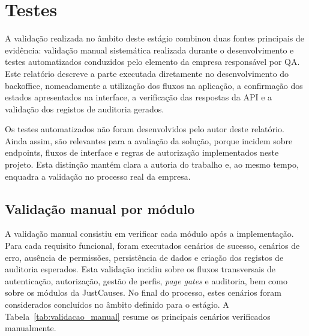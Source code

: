 
\section{Testes}
\label{sec:testes}

A validação realizada no âmbito deste estágio combinou duas fontes principais de evidência: validação manual sistemática realizada durante o desenvolvimento e testes automatizados conduzidos pelo elemento da empresa responsável por \gls{QA}. Este relatório descreve a parte executada diretamente no desenvolvimento do backoffice, nomeadamente a utilização dos fluxos na aplicação, a confirmação dos estados apresentados na interface, a verificação das respostas da \gls{API} e a validação dos registos de auditoria gerados.

Os testes automatizados não foram desenvolvidos pelo autor deste relatório. Ainda assim, são relevantes para a avaliação da solução, porque incidem sobre endpoints, fluxos de interface e regras de autorização implementados neste projeto. Esta distinção mantém clara a autoria do trabalho e, ao mesmo tempo, enquadra a validação no processo real da empresa.

\subsection{Validação manual por módulo}
\label{subsec:testes_manual}

A validação manual consistiu em verificar cada módulo após a implementação. Para cada requisito funcional, foram executados cenários de sucesso, cenários de erro, ausência de permissões, persistência de dados e criação dos registos de auditoria esperados. Esta validação incidiu sobre os fluxos transversais de autenticação, autorização, gestão de perfis, \textit{page gates} e auditoria, bem como sobre os módulos da JustCauses. No final do processo, estes cenários foram considerados concluídos no âmbito definido para o estágio. A Tabela~\ref{tab:validacao_manual} resume os principais cenários verificados manualmente.

